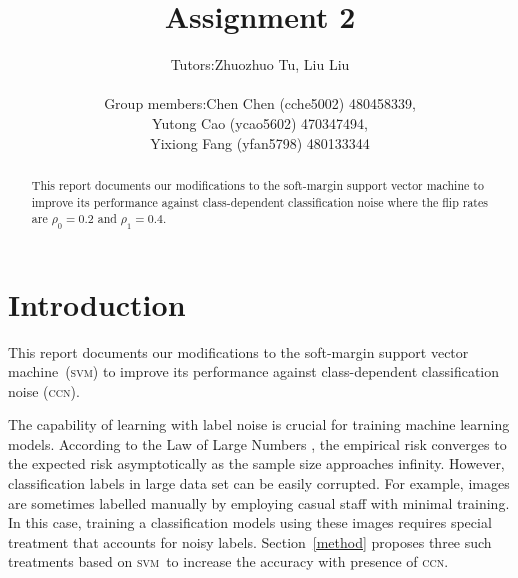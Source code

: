 \documentclass[12pt]{article} %
\title{Assignment 2}
\newcommand{\svm}{\textsc{svm}}
\begin{document}
\author{%
 \begin{tabular}{rl}
  Tutors: & Zhuozhuo Tu, Liu Liu\\ \\
Group members: & Chen Chen (cche5002) 480458339,\\
& Yutong Cao (ycao5602) 470347494,\\
& Yixiong Fang (yfan5798) 480133344
\end{tabular}
}

\maketitle



\begin{abstract}
This report documents our modifications to the soft-margin support vector machine to improve its performance against class-dependent classification noise where the flip rates are $\rho_0=0.2$ and $\rho_1=0.4$.
\end{abstract}
\tableofcontents
\section{Introduction}
This report documents our modifications to the soft-margin support vector machine~(\svm) to improve its performance against class-dependent classification noise (\textsc{ccn}).

The capability of learning with label noise is crucial for training machine learning models. According to the Law of Large Numbers \citep{hardle2007applied}, the empirical risk converges to the expected risk asymptotically as the sample size approaches infinity. However, classification labels in large data set can be easily corrupted. For example, images  are sometimes labelled manually by employing casual staff with minimal training. In this case, training a classification models using these images requires special treatment that accounts for noisy labels. Section~\ref{method} proposes three such treatments based on \svm\ to increase the accuracy with presence of \textsc{ccn}.

\end{document}
